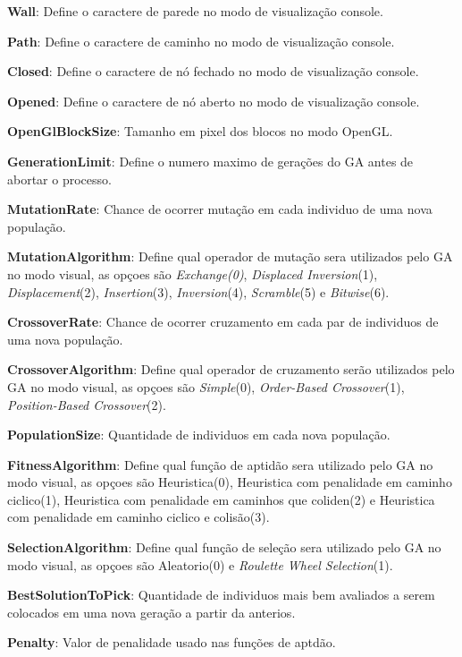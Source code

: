 \textbf{Wall}: Define o caractere de parede no modo de visualização console.

\textbf{Path}: Define o caractere de caminho no modo de visualização console.

\textbf{Closed}: Define o caractere de nó fechado no modo de visualização console.

\textbf{Opened}: Define o caractere de nó aberto no modo de visualização console.

\textbf{OpenGlBlockSize}: Tamanho em pixel dos blocos no modo OpenGL.


\textbf{GenerationLimit}: Define o numero maximo de gerações do GA antes de abortar o processo.

\textbf{MutationRate}: Chance de ocorrer mutação em cada individuo de uma nova população.

\textbf{MutationAlgorithm}:  Define qual operador de mutação sera utilizados pelo GA no modo visual, as opçoes são  \textit{Exchange(0)}, \textit{Displaced Inversion}(1), \textit{Displacement}(2), \textit{Insertion}(3), \textit{Inversion}(4), \textit{Scramble}(5) e \textit{Bitwise}(6).

\textbf{CrossoverRate}: Chance de ocorrer cruzamento em cada par de individuos de uma nova população.

\textbf{CrossoverAlgorithm}: Define qual operador de cruzamento serão utilizados pelo GA no modo visual, as opçoes são  \textit{Simple}(0), \textit{Order-Based Crossover}(1), \textit{Position-Based Crossover}(2).

\textbf{PopulationSize}: Quantidade de individuos em cada nova população.

\textbf{FitnessAlgorithm}: Define qual função de aptidão sera utilizado pelo GA no modo visual, as opçoes são Heuristica(0), Heuristica com penalidade em caminho ciclico(1), Heuristica com penalidade em caminhos que coliden(2) e Heuristica com penalidade em caminho ciclico e colisão(3).

\textbf{SelectionAlgorithm}: Define qual função de seleção sera utilizado pelo GA no modo visual, as opçoes são  Aleatorio(0) e \textit{Roulette Wheel Selection}(1).

\textbf{BestSolutionToPick}: Quantidade de individuos mais bem avaliados a serem colocados em uma nova geração a partir da anterios.

\textbf{Penalty}: Valor de penalidade usado nas funções de aptdão.

